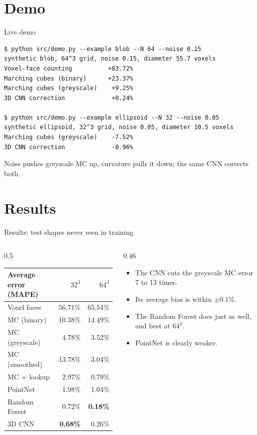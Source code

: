 \documentclass[aspectratio=169,11pt]{beamer}
\begin{document}
\section{Demo}
\begin{frame}[fragile]{Live demo}
  \footnotesize
\begin{verbatim}
$ python src/demo.py --example blob --N 64 --noise 0.15
synthetic blob, 64^3 grid, noise 0.15, diameter 55.7 voxels
Voxel-face counting          +83.72%
Marching cubes (binary)      +23.37%
Marching cubes (greyscale)    +9.25%
3D CNN correction             +0.24%

$ python src/demo.py --example ellipsoid --N 32 --noise 0.05
synthetic ellipsoid, 32^3 grid, noise 0.05, diameter 10.5 voxels
Marching cubes (greyscale)    -7.52%
3D CNN correction             -0.96%
\end{verbatim}
  \normalsize
  Noise pushes greyscale MC up, curvature pulls it down; the same CNN corrects both.
\end{frame}

\section{Results}
\begin{frame}{Results: test shapes never seen in training}
  \begin{columns}[T]
    \begin{column}{0.5\textwidth}
      \centering
      \begin{tabular}{lrr}
        \toprule
        Average error (MAPE) & $32^3$ & $64^3$ \\
        \midrule
        Voxel faces & 56.71\% & 65.54\% \\
        MC (binary) & 10.38\% & 14.49\% \\
        MC (greyscale) & 4.78\% & 3.52\% \\
        MC (smoothed) & 13.78\% & 3.04\% \\
        \midrule
        MC + lookup & 2.97\% & 0.79\% \\
        PointNet & 1.98\% & 1.04\% \\
        Random Forest & 0.72\% & \textbf{0.18\%} \\
        3D CNN & \textbf{0.68\%} & 0.26\% \\
        \bottomrule
      \end{tabular}
    \end{column}
    \begin{column}{0.46\textwidth}
      \begin{itemize}
        \item The CNN cuts the greyscale MC error 7 to 13 times.
        \item Its average bias is within $\pm0.1\%$.
        \item The Random Forest does just as well, and best at $64^3$.
        \item PointNet is clearly weaker.
      \end{itemize}
    \end{column}
  \end{columns}
\end{frame}
\end{document}
